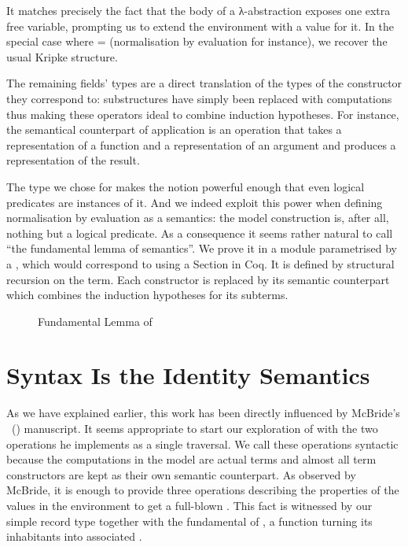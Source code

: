 It matches precisely the fact that the body of a λ-abstraction exposes
one extra free variable, prompting us to extend the environment with a
value for it. In the special case where  =  (normalisation
by evaluation for instance), we recover the usual Kripke structure.

{
\addtolength{\leftskip}{\parindent}
}

The remaining fields' types are a direct translation of the types of the
constructor they correspond to: substructures have simply been replaced with
computations thus making these operators ideal to combine induction hypotheses.
For instance, the semantical counterpart of application is an operation that
takes a representation of a function and a representation of an argument and
produces a representation of the result.

{
\addtolength{\leftskip}{\parindent}
}

The type we chose for  makes the  notion powerful
enough that even logical predicates are instances of it. And we indeed
exploit this power when defining normalisation by evaluation as a semantics:
the model construction is, after all, nothing but a logical predicate.
As a consequence it seems rather natural to call 
``the fundamental lemma of semantics''. We prove it in a module parametrised
by a , which would correspond to using a Section in Coq.
It is defined by structural recursion on the term. Each constructor is
replaced by its semantic counterpart
which combines the induction hypotheses for its subterms.

\begin{figure}[h]
\caption{Fundamental Lemma of \label{fig:fundsem}}
\end{figure}

\section{Syntax Is the Identity Semantics}
\label{sec:syntactic}

As we have explained earlier, this work has been directly influenced by
McBride's ~(\citeyear{mcbride2005type}) manuscript. It seems appropriate
to start our exploration of  with the two operations he
implements as a single traversal. We call these operations syntactic
because the computations in the model are actual terms and almost all term
constructors are kept as their own semantic counterpart. As observed by
McBride, it is enough to provide three operations describing the properties
of the values in the environment to get a full-blown . This
fact is witnessed by our simple  record type together with
the fundamental  of , a function turning its
inhabitants into associated .

